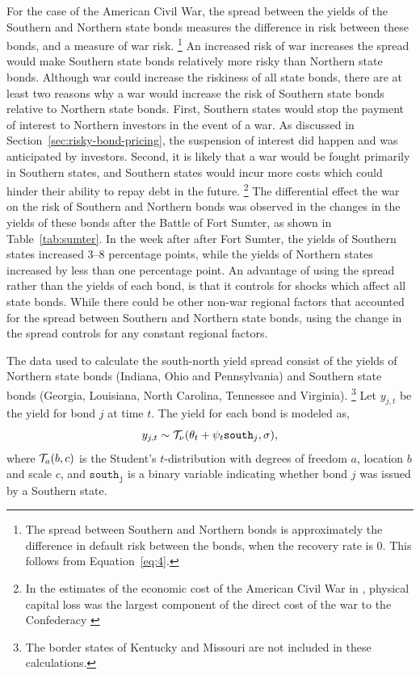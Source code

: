 \documentclass[]{article}\usepackage[]{graphicx}\usepackage[]{color}
\begin{document}
For the case of the American Civil War, the spread between the yields of the Southern and Northern state bonds measures the difference in risk between these bonds, and a measure of war risk.%
\footnote{
  The spread between Southern and Northern bonds is approximately the difference in default risk between the bonds, when the recovery rate is 0.
  This follows from Equation~\eqref{eq:4}.
}
An increased risk of war increases the spread would make Southern state bonds relatively more risky than Northern state bonds.
Although war could increase the riskiness of all state bonds, there are at least two reasons why a war would increase the risk of Southern state bonds relative to Northern state bonds.
First, Southern states would stop the payment of interest to Northern investors in the event of a war.
As discussed in Section~\ref{sec:risky-bond-pricing}, the suspension of interest did happen and was anticipated by investors.
Second, it is likely that a war would be fought primarily in Southern states, and Southern states would incur more costs which could hinder their ability to repay debt in the future.%
\footnote{In the estimates of the economic cost of the American Civil War in \textcite{GoldinLewis1975}, physical capital loss was the largest component of the direct cost of the war to the Confederacy \parencite[308]{GoldinLewis1975}}
The differential effect the war on the risk of Southern and Northern bonds was observed in the changes in the yields of these bonds after the Battle of Fort Sumter, as shown in Table~\ref{tab:sumter}.
In the week after after Fort Sumter, the yields of Southern states increased 3--8 percentage points, while the yields of Northern states increased by less than one percentage point.
An advantage of using the spread rather than the yields of each bond, is that it controls for shocks which affect all state bonds.
While there could be other non-war regional factors that accounted for the spread between Southern and Northern state bonds, using the change in the spread controls for any constant regional factors.

The data used to calculate the south-north yield spread consist of the yields of Northern state bonds (Indiana, Ohio and Pennsylvania) and Southern state bonds (Georgia, Louisiana, North Carolina, Tennessee and Virginia).
\footnote{The border states of Kentucky and Missouri are not included in these calculations.}
Let $y_{j,t}$ be the yield for bond $j$ at time $t$.
The yield for each bond is modeled as,
\begin{equation}
  y_{j,t} \sim \mathcal{T}_{\nu}\mathopen{}\left(\theta_{t} + \psi_{t} \mathtt{south}_{j}, \sigma\right)\mathclose{} \text{,}
\end{equation}
where $\mathcal{T}_{a}\mathopen{}\left(b, c\right)\mathclose{}$ is the Student's $t$-distribution with degrees of freedom $a$, location $b$ and scale $c$, and
$\mathtt{south_{j}}$ is a binary variable indicating whether bond $j$ was issued by a Southern state.
\end{document}
